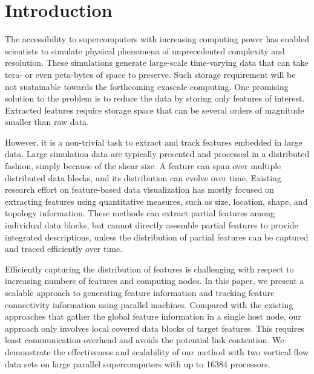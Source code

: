 \section{Introduction}

The accessibility to supercomputers with increasing computing power has enabled scientists to simulate physical phenomena of unprecedented complexity and resolution. These simulations generate large-scale time-varying data that can take tera- or even peta-bytes of space to preserve. Such storage requirement will be not sustainable towards the forthcoming exascale computing. One promising solution to the problem is to reduce the data by storing only features of interest. Extracted features require storage space that can be several orders of magnitude smaller than raw data.

However, it is a non-trivial task to extract and track features embedded in large data. Large simulation data are typically presented and processed in a distributed fashion, simply because of the shear size. A feature can span over multiple distributed data blocks, and its distribution can evolve over time. Existing research effort on feature-based data visualization has mostly focused on extracting features using quantitative measures, such as size, location, shape, and topology information. These methods can extract partial features among individual data blocks, but cannot directly assemble partial features to provide integrated descriptions, unless the distribution of partial features can be captured and traced efficiently over time.

Efficiently capturing the distribution of features is challenging with respect to increasing numbers of features and computing nodes. In this paper, we present a scalable approach to generating feature information and tracking feature connectivity information using parallel machines. Compared with the existing approaches that gather the global feature information in a single host node, our approach only involves local covered data blocks of target features. This requires least communication overhead and avoids the potential link contention. We demonstrate the effectiveness and scalability of our method with two vortical flow data sets on large parallel supercomputers with up to 16384 processors.